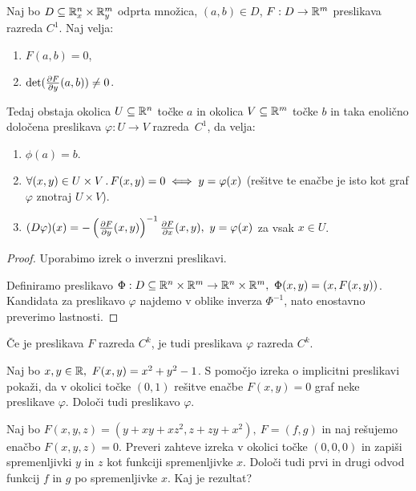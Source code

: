 \begin{izrek}
    Naj bo $D\subseteq \mathbb{R}_x^n \times \mathbb{R}_y^m$ odprta množica, $(a, b) \in D$, $F: D \to \mathbb{R}^m$ preslikava razreda $C^1$. Naj velja:
    \begin{enumerate}
        \item $F(a, b) = 0$,
        \item $\det(\frac{\partial F}{\partial y}(a,b)) \neq 0$.
    \end{enumerate}
    Tedaj obstaja okolica $U \subseteq \mathbb{R}^n$ točke $a$ in okolica $V \subseteq \mathbb{R}^m$ točke $b$ in taka enolično določena preslikava $\varphi: U \to V$ razreda~$C^1$, da velja:
    \begin{enumerate}
        \item $\phi(a) = b$.
        \item $\forall (x,y) \in U \times V \,.\, F(x,y) = 0 \iff y = \varphi(x)$ (rešitve te enačbe je isto kot graf $\varphi$ znotraj $U \times V$).
        \item $(D \varphi)(x) = - \left(\frac{\partial F}{\partial y}(x,y)\right)^{-1} \frac{\partial F}{\partial x}(x,y), \ y = \varphi(x)$ za vsak $x \in U$.
    \end{enumerate}
\end{izrek}

\begin{proof}
    Uporabimo izrek o inverzni preslikavi. 
    
    Definiramo preslikavo $\Phi: D \subseteq \mathbb{R}^n \times \mathbb{R}^m \to  \mathbb{R}^n \times \mathbb{R}^m, \ \Phi(x,y) = (x, F(x,y))$. Kandidata za preslikavo $\varphi$ najdemo v oblike inverza $\Phi^{-1}$, nato enostavno preverimo lastnosti.
\end{proof}

\begin{posledica}
    Če je preslikava $F$ razreda $C^k$, je tudi preslikava $\varphi$ razreda $C^k$.
\end{posledica}

\begin{zgled}
    Naj bo $x,y \in \mathbb{R}, \ F(x, y) = x^2 + y^2 -1$. S pomočjo izreka o implicitni preslikavi pokaži, da v okolici točke $(0,1)$ rešitve enačbe $F(x,y) = 0$ graf neke preslikave $\varphi$. Določi tudi preslikavo $\varphi$.
\end{zgled}

\begin{zgled}
    Naj bo $F(x,y,z) = (y + xy+xz^2, z+zy+x^2), \ F = (f, g)$ in naj rešujemo enačbo $F(x,y,z) = 0$. Preveri zahteve izreka v okolici točke $(0,0,0)$ in zapiši spremenljivki $y$ in $z$ kot funkciji spremenljivke $x$. Določi tudi prvi in drugi odvod funkcij $f$ in $g$ po spremenljivke $x$. Kaj je rezultat?
\end{zgled}

